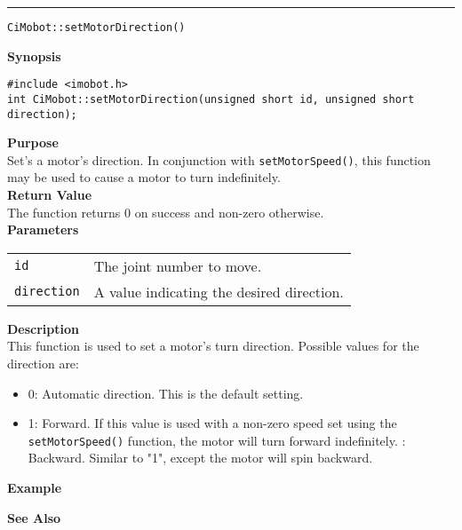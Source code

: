 \noindent
\vspace{5pt}
\rule{6.5in}{0.015in}
\noindent
{\LARGE \texttt{CiMobot::setMotorDirection()}}\\
{}

\noindent
{\bf Synopsis}\\
\begin{verbatim}
#include <imobot.h>
int CiMobot::setMotorDirection(unsigned short id, unsigned short direction);
\end{verbatim}

\noindent
{\bf Purpose}\\
Set's a motor's direction. In conjunction with \texttt{setMotorSpeed()}, this
function may be used to cause a motor to turn indefinitely.\\

\noindent
{\bf Return Value}\\
The function returns 0 on success and non-zero otherwise.\\

\noindent
{\bf Parameters}
\vspace{-0.1in}
\begin{description}
\item               
\begin{tabular}{p{20 mm}p{145 mm}}
\texttt{id} & The joint number to move. \\
\texttt{direction} & A value indicating the desired direction.
\end{tabular}
\end{description}

\noindent
{\bf Description}\\
This function is used to set a motor's turn direction. Possible values for the
direction are:
\begin{itemize}
\item 0: Automatic direction. This is the default setting. 
\item 1: Forward. If this value is used with a non-zero speed set using the
\texttt{setMotorSpeed()} function, the motor will turn forward indefinitely.
: Backward. Similar to "1", except the motor will spin backward.
\end{itemize}

\noindent
{\bf Example}\\
\noindent

\noindent
{\bf See Also}\\


